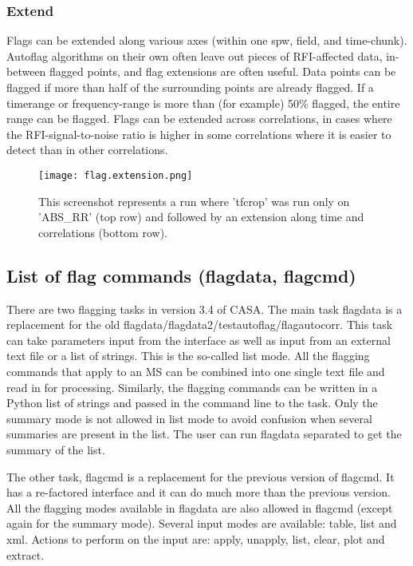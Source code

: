 \subsubsection{Extend}

Flags can be extended along various axes (within one spw, field, and time-chunk). 
Autoflag algorithms on their own often leave out pieces of RFI-affected data, in-between flagged
points, and flag extensions are often useful.  Data points can be flagged if more than half of 
the surrounding points are already flagged.  If a timerange or frequency-range is more than 
(for example) 50\% flagged, the entire range can be flagged.  Flags can be extended across
correlations, in cases where the RFI-signal-to-noise ratio is higher in some correlations where
it is easier to detect than in other correlations. 

\begin{figure}
\texttt{[image: flag.extension.png]}
\caption{This screenshot represents a run where 'tfcrop' was run only on
'ABS\_RR' (top row) and followed by an extension along time and correlations
(bottom row). }
\end{figure}




\subsection{List of flag commands (flagdata, flagcmd)}
\label{Sec:FlagCmdLists}
There are two flagging tasks in version 3.4 of CASA. The main task flagdata is
a replacement for the old flagdata/flagdata2/testautoflag/flagautocorr. This
task can take parameters input from the interface as well as input from an
external text file or a list of strings. This is the so-called list mode. All the flagging commands
that apply to an MS can be combined into one single text file and read in for
processing. Similarly, the flagging commands can be written in a Python list of strings
and passed in the command line to the task. Only the summary mode is not allowed in list mode to avoid
confusion when several summaries are present in the list. The user can run
flagdata separated to get the summary of the list. 

The other task, flagcmd is a replacement for the previous version of flagcmd. It
has a re-factored interface and it can do much more than the previous version.
All the flagging modes available in flagdata are also allowed in flagcmd
(except again for the summary mode). Several input modes are available: table,
list and xml. Actions to perform on the input are: apply, unapply, list,
clear, plot and extract.


